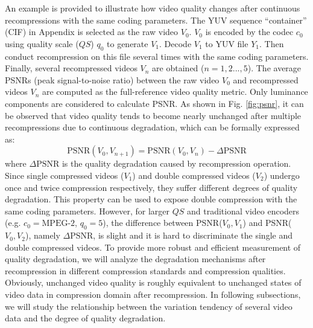 \documentclass[journal,sort]{IEEEtran}
\begin{document}
An example is provided to illustrate how video quality changes after continuous recompressions with the same coding parameters. The YUV sequence ``container'' (CIF) in Appendix is selected as the raw video $V_0$. $V_0$ is encoded by the codec $c_0$ using quality scale ($QS$) $q_0$ to generate $V_1$. Decode $V_1$ to YUV file $Y_1$. Then conduct recompression on this file several times with the same coding parameters. Finally, several recompressed videos $V_n$ are obtained ($n=1,2...,5$). The average PSNRs (peak signal-to-noise ratio) between the raw video $V_0$ and recompressed videos $V_n$ are computed as the full-reference video quality metric. Only luminance components are considered to calculate PSNR. As shown in Fig. \ref{fig:psnr}, it can be observed that video quality tends to become nearly unchanged after multiple recompressions due to continuous degradation, which can be formally expressed as:
\begin{equation}
\text{PSNR}(V_0,V_{n+1}) =  \text{PSNR}(V_0,V_{n}) - \Delta \text{PSNR}
\label{psnr}
\end{equation}
where $\Delta \text{PSNR}$ is the quality degradation caused by recompression operation. Since single compressed videos ($V_1$) and double compressed videos ($V_2$) undergo once and twice compression respectively, they suffer different degrees of quality degradation. This property can be used to expose double compression with the same coding parameters. However, for larger $QS$ and traditional video encoders (e.g. $c_0=\text{MPEG-2}$, $q_0=5$), the difference between PSNR($V_0,V_1$) and PSNR($V_0,V_2$), namely $\Delta \text{PSNR}$, is slight and it is hard to discriminate the single and double compressed videos. To provide more robust and efficient measurement of quality degradation, we will analyze the degradation mechanisms after recompression in different compression standards and compression qualities. Obviously, unchanged video quality is roughly equivalent to unchanged states of video data in compression domain after recompression. In following subsections, we will study the relationship between the variation tendency of several video data and the degree of quality degradation. 
\end{document}
